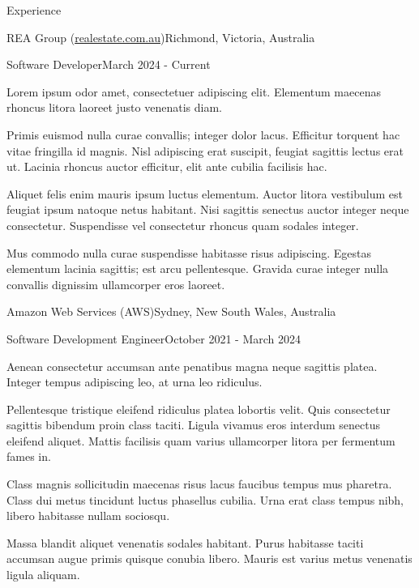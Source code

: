 \documentclass{xsha}
\begin{document}
\begin{xsection}{Experience}

\begin{xheading}{REA Group (\href{https://realestate.com.au/}{realestate.com.au})}{Richmond, Victoria, Australia}
\begin{xsubheading}{Software Developer}{March 2024 - Current}
\item Lorem ipsum odor amet, consectetuer adipiscing elit. Elementum maecenas rhoncus litora laoreet justo venenatis diam.
\item Primis euismod nulla curae convallis; integer dolor lacus. Efficitur torquent hac vitae fringilla id magnis. Nisl adipiscing erat suscipit, feugiat sagittis lectus erat ut. Lacinia rhoncus auctor efficitur, elit ante cubilia facilisis hac.
\item Aliquet felis enim mauris ipsum luctus elementum. Auctor litora vestibulum est feugiat ipsum natoque netus habitant. Nisi sagittis senectus auctor integer neque consectetur. Suspendisse vel consectetur rhoncus quam sodales integer.
\item Mus commodo nulla curae suspendisse habitasse risus adipiscing. Egestas elementum lacinia sagittis; est arcu pellentesque. Gravida curae integer nulla convallis dignissim ullamcorper eros laoreet.
\end{xsubheading}
\end{xheading}

\begin{xheading}{Amazon Web Services (AWS)}{Sydney, New South Wales, Australia}
\begin{xsubheading}{Software Development Engineer}{October 2021 - March 2024}
\item Aenean consectetur accumsan ante penatibus magna neque sagittis platea. Integer tempus adipiscing leo, at urna leo ridiculus.
\item Pellentesque tristique eleifend ridiculus platea lobortis velit. Quis consectetur sagittis bibendum proin class taciti. Ligula vivamus eros interdum senectus eleifend aliquet. Mattis facilisis quam varius ullamcorper litora per fermentum fames in.
\item Class magnis sollicitudin maecenas risus lacus faucibus tempus mus pharetra. Class dui metus tincidunt luctus phasellus cubilia. Urna erat class tempus nibh, libero habitasse nullam sociosqu.
\item Massa blandit aliquet venenatis sodales habitant. Purus habitasse taciti accumsan augue primis quisque conubia libero. Mauris est varius metus venenatis ligula aliquam.
\end{xsubheading}
\end{xheading}


\end{xsection}
\end{document}
